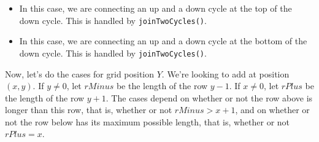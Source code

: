 \documentclass[12pt]{article}
\numberwithin{equation}{section}
\begin{document}
\begin{itemize}
   \item In this case, we are connecting an up and a down cycle at the top of the down cycle.
   This is handled by \texttt{joinTwoCycles()}.

   \item In this case, we are connecting an up and a down cycle at the bottom of the down cycle.
   This is handled by \texttt{joinTwoCycles()}.
  \end{itemize}

  Now, let's do the cases for grid position $Y$.
  We're looking to add at position $(x, y)$.
  If $y \neq 0$, let $rMinus$ be the length of the row $y - 1$.
  If $x \neq 0$, let $rPlus$ be the length of the row $y + 1$.
  The cases depend on whether or not the row above is longer than this row, that is, whether or not $rMinus > x + 1$, and on whether or not the row below has its maximum possible length, that is, whether or not $rPlus = x$.
\end{document}

